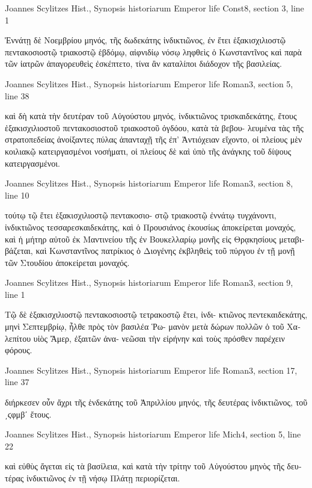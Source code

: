 \documentclass[12pt,letterpaper,twoside,final]{memoir}
\begin{document}
\begin{greek}
Joannes Scylitzes Hist., Synopsis historiarum 
Emperor life Const8, section 3, line 1

Ἐννάτῃ δὲ Νοεμβρίου μηνός, τῆς δωδεκάτης ἰνδικτιῶνος, ἐν ἔτει 
ἑξακισχιλιοστῷ πεντακοσιοστῷ τριακοστῷ ἑβδόμῳ, αἰφνιδίῳ νόσῳ 
ληφθεὶς ὁ Κωνσταντῖνος καὶ παρὰ τῶν ἰατρῶν ἀπαγορευθεὶς ἐσκέπτετο, 
τίνα ἂν καταλίποι διάδοχον τῆς βασιλείας. 



Joannes Scylitzes Hist., Synopsis historiarum 
Emperor life Roman3, section 5, line 38

                                                            καὶ δὴ κατὰ τὴν 
δευτέραν τοῦ Αὐγούστου μηνός, ἰνδικτιῶνος τρισκαιδεκάτης, ἔτους 
ἑξακισχιλιοστοῦ πεντακοσιοστοῦ τριακοστοῦ ὀγδόου, κατὰ τὰ βεβου-
λευμένα τὰς τῆς στρατοπεδείας ἀνοίξαντες πύλας ἁπανταχῇ τῆς ἐπ' 
Ἀντιόχειαν εἴχοντο, οἱ πλείους μὲν κοιλιακῷ κατειργασμένοι νοσήματι, 
οἱ πλείους δὲ καὶ ὑπὸ τῆς ἀνάγκης τοῦ δίψους κατειργασμένοι. 



Joannes Scylitzes Hist., Synopsis historiarum 
Emperor life Roman3, section 8, line 10

                           τούτῳ τῷ ἔτει ἑξακισχιλιοστῷ πεντακοσιο-
στῷ τριακοστῷ ἐννάτῳ τυγχάνοντι, ἰνδικτιῶνος τεσσαρεσκαιδεκάτης, 
καὶ ὁ Προυσιάνος ἑκουσίως ἀποκείρεται μοναχός, καὶ ἡ μήτηρ αὐτοῦ 
ἐκ Μαντινείου τῆς ἐν Βουκελλαρίῳ μονῆς εἰς Θρᾳκησίους μεταβιβάζεται, 
καὶ Κωνσταντῖνος πατρίκιος ὁ Διογένης ἐκβληθεὶς τοῦ πύργου ἐν τῇ 
μονῇ τῶν Στουδίου ἀποκείρεται μοναχός. 



Joannes Scylitzes Hist., Synopsis historiarum 
Emperor life Roman3, section 9, line 1

Τῷ δὲ ἑξακισχιλιοστῷ πεντακοσιοστῷ τετρακοστῷ ἔτει, ἰνδι-
κτιῶνος πεντεκαιδεκάτης, μηνὶ Σεπτεμβρίῳ, ἦλθε πρὸς τὸν βασιλέα Ῥω-  
μανὸν μετὰ δώρων πολλῶν ὁ τοῦ Χαλεπίτου υἱὸς Ἄμερ, ἐξαιτῶν ἀνα-
νεῶσαι τὴν εἰρήνην καὶ τοὺς πρόσθεν παρέχειν φόρους. 



Joannes Scylitzes Hist., Synopsis historiarum 
Emperor life Roman3, section 17, line 37

                                            διήρκεσεν οὖν ἄχρι τῆς ἑνδεκάτης 
τοῦ Ἀπριλλίου μηνός, τῆς δευτέρας ἰνδικτιῶνος, τοῦ ͵ϛφμβʹ ἔτους. 



Joannes Scylitzes Hist., Synopsis historiarum 
Emperor life Mich4, section 5, line 22

                                         καὶ εὐθὺς ἄγεται εἰς τὰ βασίλεια, καὶ 
κατὰ τὴν τρίτην τοῦ Αὐγούστου μηνὸς τῆς δευτέρας ἰνδικτιῶνος ἐν τῇ 
νήσῳ Πλάτῃ περιορίζεται. 




\end{greek}
\end{document}
